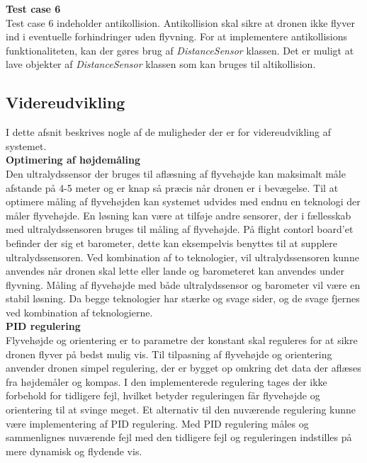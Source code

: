 \textbf{Test case 6}\\
Test case 6 indeholder antikollision. Antikollision skal sikre at dronen ikke flyver ind i eventuelle forhindringer uden flyvning. For at implementere antikollisions funktionaliteten, kan der gøres brug af \textit{DistanceSensor} klassen. Det er muligt at lave objekter af \textit{DistanceSensor} klassen som kan bruges til altikollision. 

\newpage

\subsection{Videreudvikling}

I dette afsnit beskrives nogle af de muligheder der er for videreudvikling af systemet.  \\

\textbf{Optimering af højdemåling}\\
Den ultralydssensor der bruges til aflæsning af flyvehøjde kan maksimalt måle afstande på 4-5 meter og er knap så præcis når dronen er i bevægelse. 
Til at optimere måling af flyvehøjden kan systemet udvides med endnu en teknologi der måler flyvehøjde. En løsning kan være at tilføje andre sensorer, der i fællesskab med ultralydssensoren bruges til måling af flyvehøjde. 
På flight contorl board'et befinder der sig et barometer, dette kan eksempelvis benyttes til at supplere ultralydssensoren.
Ved kombination af to teknologier, vil ultralydssensoren kunne anvendes når dronen skal lette eller lande og barometeret kan anvendes under flyvning. 
Måling af flyvehøjde med både ultralydssensor og barometer vil være en stabil løsning. Da begge teknologier har stærke og svage sider, og de svage fjernes ved kombination af teknologierne.\\


\textbf{PID regulering}\\
Flyvehøjde og orientering er to parametre der konstant skal reguleres for at sikre dronen flyver på bedst mulig vis. Til tilpasning af flyvehøjde og orientering anvender dronen simpel regulering, der er bygget op omkring det data der aflæses fra højdemåler og kompas.
I den implementerede regulering tages der ikke forbehold for tidligere fejl, hvilket betyder reguleringen får flyvehøjde og orientering til at svinge meget. 
Et alternativ til den nuværende regulering kunne være implementering af PID regulering. Med PID regulering måles og sammenlignes nuværende fejl med den tidligere fejl og reguleringen indstilles på mere dynamisk og flydende vis. \\


